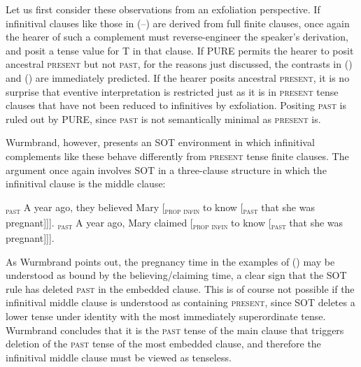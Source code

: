 \documentclass[output=paper]{langscibook}
\begin{document}
\begin{sloppypar}
Let us first consider these observations from an exfoliation perspective. If infinitival clauses like those in (--) are derived from full finite clauses, once again the hearer of such a complement must reverse-engineer the speaker's derivation, and posit a tense value for T in that clause. If PURE permits the hearer to posit ancestral \textsc{present} but not \textsc{past}, for the reasons just discussed, the contrasts in () and () are immediately predicted. If the hearer posits ancestral \textsc{present}, it is no surprise that eventive interpretation is restricted just as it is in \textsc{present} tense clauses that have not been reduced to infinitives by exfoliation. Positing \textsc{past} is ruled out by PURE, since \textsc{past} is not semantically minimal as \textsc{present} is. 
\end{sloppypar}

Wurmbrand, however, presents an SOT environment in which infinitival complements like these behave differently from \textsc{present} tense finite clauses. The argument once again involves SOT in a three-clause structure in which the infinitival clause is the middle clause:

\a {[}\textsubscript{\textsc{past}} A year ago, they believed Mary {[}\textsubscript{\textsc{prop infin}} to know {[}\textsubscript{\textsc{past}} that she was pregnant{]]]}.
\a {[}\textsubscript{\textsc{past}} A year ago, Mary claimed {[}\textsubscript{\textsc{prop infin}} to know {[}\textsubscript{\textsc{past}} that she was pregnant{]]]}.
\xe

\noindent As Wurmbrand points out, the pregnancy time in the examples
of () may be understood as bound by
the believing/claiming time, a clear sign that the SOT rule has deleted
\textsc{past} in the embedded clause. This is of course not possible
if the infinitival middle clause is understood as containing \textsc{present},
since SOT deletes a lower tense under identity with the most
immediately superordinate tense. Wurmbrand concludes that it is the
\textsc{past} tense of the main clause that triggers deletion of the
\textsc{past} tense of the most embedded clause, and therefore the infinitival
middle clause must be viewed as tenseless.
\end{document}
